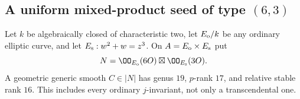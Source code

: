 \subsection{A uniform mixed-product seed of type $(6,3)$}
\label{sec:root-mixed-six-three}

\begin{lemma}
\label{lem:root-mixed-six-three-cartier}
Let $k$ be algebraically closed of characteristic two, let
$E_{\rm o}/k$ be any ordinary elliptic curve, and let
$E_{\rm s}:w^2+w=z^3$. On $A=E_{\rm o}\times E_{\rm s}$ put
\[
 N=\OO_{E_{\rm o}}(6O)\boxtimes\OO_{E_{\rm s}}(3O).
\]
A geometric generic smooth $C\in|N|$ has genus $19$, $p$-rank
$17$, and relative stable rank $16$. This includes every ordinary
$j$-invariant, not only a transcendental one.
\end{lemma}
